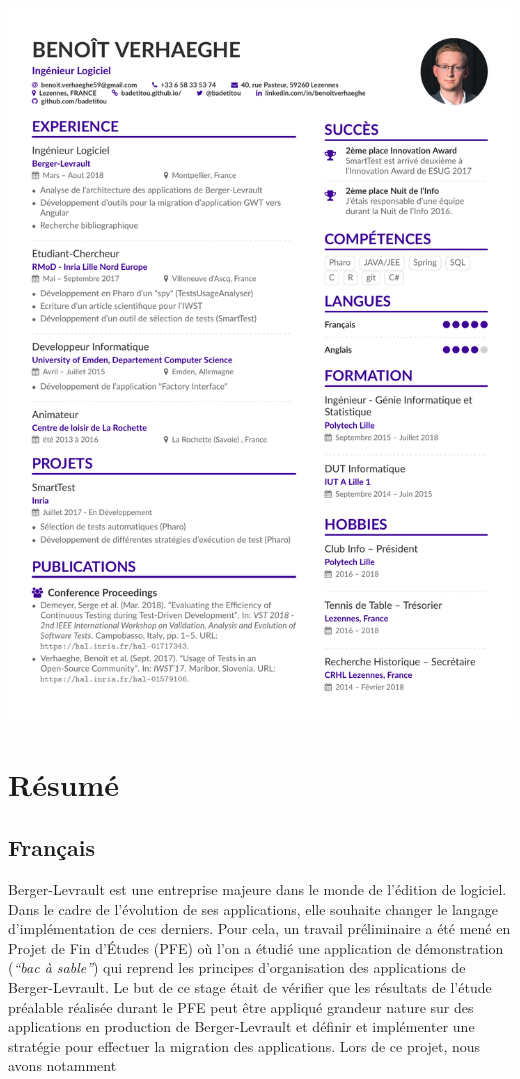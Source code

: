 \includegraphics{cv/cv.pdf} \newpage

\hypertarget{ruxe9sumuxe9}{%
\section{Résumé}\label{ruxe9sumuxe9}}

\hypertarget{franuxe7ais}{%
\subsection{Français}\label{franuxe7ais}}

Berger-Levrault est une entreprise majeure dans le monde de l'édition de
logiciel. Dans le cadre de l'évolution de ses applications, elle
souhaite changer le langage d'implémentation de ces derniers. Pour cela,
un travail préliminaire a été mené en Projet de Fin d'Études (PFE) où
l'on a étudié une application de démonstration (\emph{``bac à sable''})
qui reprend les principes d'organisation des applications de
Berger-Levrault. Le but de ce stage était de vérifier que les résultats
de l'étude préalable réalisée durant le PFE peut être appliqué grandeur
nature sur des applications en production de Berger-Levrault et définir
et implémenter une stratégie pour effectuer la migration des
applications. Lors de ce projet, nous avons notamment

